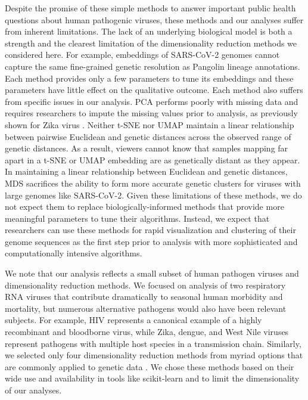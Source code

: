 \documentclass[10pt,letterpaper]{article}
\begin{document}
Despite the promise of these simple methods to answer important public health questions about human pathogenic viruses, these methods and our analyses suffer from inherent limitations.
The lack of an underlying biological model is both a strength and the clearest limitation of the dimensionality reduction methods we considered here.
For example, embeddings of SARS-CoV-2 genomes cannot capture the same fine-grained genetic resolution as Pangolin lineage annotations.
Each method provides only a few parameters to tune its embeddings and these parameters have little effect on the qualitative outcome.
Each method also suffers from specific issues in our analysis.
PCA performs poorly with missing data and requires researchers to impute the missing values prior to analysis, as previously shown for Zika virus \cite{metsky_2017}.
Neither t-SNE nor UMAP maintain a linear relationship between pairwise Euclidean and genetic distances across the observed range of genetic distances.
As a result, viewers cannot know that samples mapping far apart in a t-SNE or UMAP embedding are as genetically distant as they appear.
In maintaining a linear relationship between Euclidean and genetic distances, MDS sacrifices the ability to form more accurate genetic clusters for viruses with large genomes like SARS-CoV-2.
Given these limitations of these methods, we do not expect them to replace biologically-informed methods that provide more meaningful parameters to tune their algorithms.
Instead, we expect that researchers can use these methods for rapid visualization and clustering of their genome sequences as the first step prior to analysis with more sophisticated and computationally intensive algorithms.

We note that our analysis reflects a small subset of human pathogen viruses and dimensionality reduction methods.
We focused on analysis of two respiratory RNA viruses that contribute dramatically to seasonal human morbidity and mortality, but numerous alternative pathogens would also have been relevant subjects.
For example, HIV represents a canonical example of a highly recombinant and bloodborne virus, while Zika, dengue, and West Nile viruses represent pathogens with multiple host species in a transmission chain.
Similarly, we selected only four dimensionality reduction methods from myriad options that are commonly applied to genetic data \cite{Armstrong2022}.
We chose these methods based on their wide use and availability in tools like scikit-learn \cite{Pedregosa2011} and to limit the dimensionality of our analyses.
\end{document}
